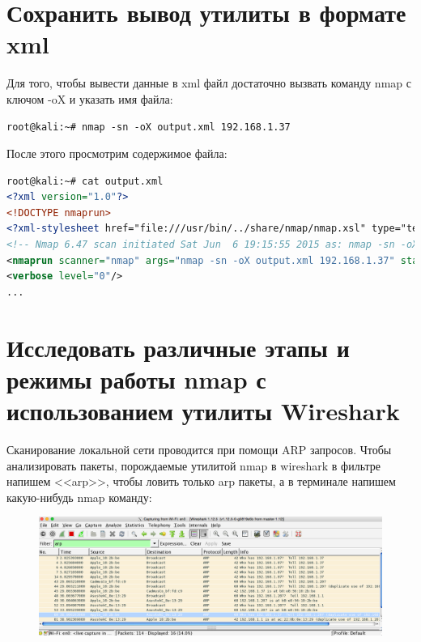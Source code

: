 \documentclass[utf8x, 12pt]{G7-32}
\begin{document}
\newpage
\section{Сохранить вывод утилиты в формате xml}

Для того, чтобы вывести данные в xml файл достаточно вызвать команду nmap с ключом -oX и указать имя файла:

\begin{lstlisting}
root@kali:~# nmap -sn -oX output.xml 192.168.1.37
\end{lstlisting}


После этого просмотрим содержимое файла:

\begin{lstlisting}[language=XML]
root@kali:~# cat output.xml 
<?xml version="1.0"?>
<!DOCTYPE nmaprun>
<?xml-stylesheet href="file:///usr/bin/../share/nmap/nmap.xsl" type="text/xsl"?>
<!-- Nmap 6.47 scan initiated Sat Jun  6 19:15:55 2015 as: nmap -sn -oX output.xml 192.168.1.37 -->
<nmaprun scanner="nmap" args="nmap -sn -oX output.xml 192.168.1.37" start="1433632555" startstr="Sat Jun  6 19:15:55 2015" version="6.47" xmloutputversion="1.04">
<verbose level="0"/>
...
\end{lstlisting}

\newpage
\section{Исследовать различные этапы и режимы работы nmap с использованием утилиты Wireshark}


Сканирование локальной сети проводится при помощи ARP запросов. Чтобы анализировать пакеты, порождаемые утилитой nmap в wireshark в фильтре напишем <<arp>>, чтобы ловить только arp пакеты, а в терминале напишем какую-нибудь nmap  команду:


\begin{figure}[hhh!]
	\begin{center}
		\includegraphics[width=16cm]{img/wireshark}
	\end{center}
\end{figure}	
\end{document}
